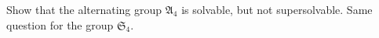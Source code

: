 Show that the alternating group $\mathfrak{A}_4$ is solvable, but not supersolvable. Same question for the group $\mathfrak{S}_4$.
